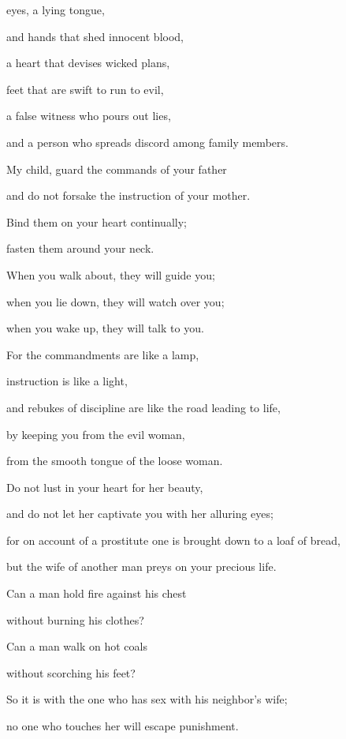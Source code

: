 {eyes,
a lying
tongue,
\par }{\Q and hands
that shed
innocent
blood,
\par }{\Q {}a heart
that devises
wicked
plans,
\par }{\Q feet
that are swift
to run
to evil,
\par }{\Q {}a false
witness
who pours out
lies,
\par }{\Q and a person who spreads
discord
among
family members.
\par }{\Q {}My child,
guard
the commands
of your father
\par }{\Q and do not
forsake
the instruction
of your mother.
\par }{\Q {}Bind
them on
your heart
continually;
\par }{\Q fasten
them around
your neck.
\par }{\Q {}When you walk
about, they will guide
you;
\par }{\Q when you lie
down, they will watch
over
you;
\par }{\Q when you wake
up, they will talk to you.
\par }{\Q {}For
the commandments
are like a lamp,
\par }{\Q instruction
is like a light,
\par }{\Q and rebukes
of discipline
are like the road
leading to life,
\par }{\Q {}by keeping
you from the evil
woman,
\par }{\Q from the smooth
tongue
of the loose woman.
\par }{\Q {}Do not
lust in your heart
for her beauty,
\par }{\Q and do not
let her captivate you with her alluring eyes;
\par }{\Q {}for
on account
of a prostitute
one is brought down to
a loaf
of bread,
\par }{\Q but the wife
of another man
preys
on your precious
life.
\par }{\Q {}Can a man
hold
fire
against his chest
\par }{\Q without
burning
his clothes?
\par }{\Q {}Can
a man
walk
on
hot coals
\par }{\Q without
scorching
his feet?
\par }{\Q {}So
it is with the one who has sex
with
his neighbor’s
wife;
\par }{\Q no one
who touches
her will escape punishment.
}

